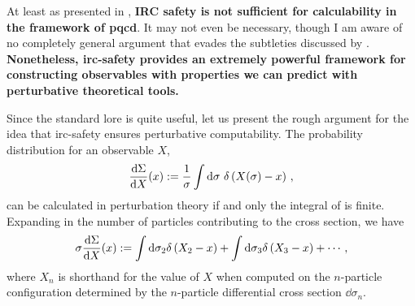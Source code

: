     At least as presented in , \textbf{IRC safety is not sufficient for calculability in the framework of \gls{pqcd}}.
    It may not even be necessary, though I am aware of no  completely general argument that evades the subtleties discussed by .
    \textbf{Nonetheless, \gls{irc-safety} provides an extremely powerful framework for constructing observables with properties we can predict with perturbative theoretical tools.}





Since the standard lore is quite useful, let us present the rough argument for the idea that \gls{irc-safety} ensures perturbative computability.
%
The probability distribution for an observable \(X\),
\begin{align}
    \label{eq:prob_distribution_irc}
    \frac{\dd\Sigma}{\dd X}(x)
    :=
    \frac{1}{\sigma}
    \int \dd \sigma
    \,\,
    \delta\le(X(\sigma) - x\ri)
    \,,
\end{align}
can be calculated in perturbation theory if and only the integral of  is finite.
%
Expanding in the number of particles contributing to the cross section, we have
\begin{align}
    \sigma \frac{\dd\Sigma}{\dd X}(x)
    :=
    \int \dd\sigma_2 \delta\left(X_2 - x\right)
    +
    \int \dd\sigma_3 \delta\left(X_3 - x\right)
    +
    \cdots
    \,,
\end{align}
where \(X_n\) is shorthand for the value of \(X\) when computed on the \(n\)-particle configuration determined by the \(n\)-particle differential cross section \(\dd \sigma_n\).

